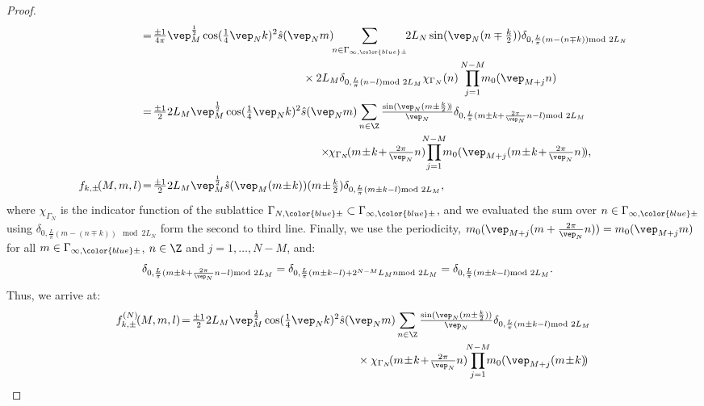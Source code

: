 \documentclass[a4paper, 11pt]{article}
\DeclareMathOperator{\1}{\mathds{1}}
\begin{document}
\begin{proof}
\begin{align*}
&\!=\!\tfrac{\pm1}{4\pi}\vep_{M}^{\frac{1}{2}} \cos(\tfrac{1}{4}\vep_{N}k)^{2}\hat{s}(\vep_{N}m)\!\!\sum_{n\in\Gamma_{\infty,{\color{blue}\pm}}}\!\!2L_{N}\sin(\vep_{N}(n\mp\tfrac{k}{2}))\delta_{0,\frac{L}{\pi}(m-(n\mp k))\!\!\!\!\mod 2L_{N}} \\
& \hspace{5cm} \times 2L_{M}\delta_{0,\frac{L}{\pi}(n-l)\!\!\!\!\mod 2L_{M}}\chi_{\Gamma_{N}}(n)\prod_{j=1}^{N-M}\!\!\!m_{0}(\vep_{M+j}n) \\
&\!=\!\tfrac{\pm1}{2}2L_{M}\vep_{M}^{\frac{1}{2}} \cos(\tfrac{1}{4}\vep_{N}k)^{2}\hat{s}(\vep_{N}m)\sum_{n\in\Z}\tfrac{\sin(\vep_{N}(m\pm\frac{k}{2})\!)}{\vep_{N}} \delta_{0,\frac{L}{\pi}(m\pm k+\frac{2\pi}{\vep_{N}}n-l)\!\!\!\!\mod 2L_{M}}\\
& \hspace{5.5cm} \times\!\!\chi_{\Gamma_{N}}\!(m\!\pm\!k\!+\!\tfrac{2\pi}{\vep_{N}}n)\!\!\!\prod_{j=1}^{N-M}\!\!\!m_{0}(\vep_{M+j}(m\!\pm\!k\!+\!\tfrac{2\pi}{\vep_{N}}n)\!), \\
f_{k,\pm}\!(M,m,l) &\!=\!\tfrac{\pm1}{2}2L_{M}\vep_{M}^{\frac{1}{2}}\hat{s}(\vep_{M}(m\!\pm\!k))(m\!\pm\!\tfrac{k}{2})\delta_{0,\frac{L}{\pi}(m\pm k-l)\!\!\!\!\mod 2L_{M}},
\end{align*}
where $\chi_{\Gamma_{N}}$ is the indicator function of the sublattice $\Gamma_{N,{\color{blue}\pm}}\subset\Gamma_{\infty,{\color{blue}\pm}}$, and we evaluated the sum over $n\in\Gamma_{\infty,{\color{blue}\pm}}$ using $\delta_{0,\frac{L}{\pi}(m-(n\mp k))\!\!\!\!\mod 2L_{N}}$ form the second to third line. Finally, we use the periodicity, $m_{0}(\vep_{M+j}(m+\tfrac{2\pi}{\vep_{N}}n)) = m_{0}(\vep_{M+j}m)$ for all $m\in\Gamma_{\infty,{\color{blue}\pm}}$, $n\in\Z$ and $j=1,\dots,N-M$, and:
\begin{align*}
\delta_{0,\frac{L}{\pi}(m\pm k+\frac{2\pi}{\vep_{N}}n-l)\!\!\!\!\mod 2L_{M}} & = \delta_{0,\frac{L}{\pi}(m\pm k-l)+2^{N-M}L_{M}n\!\!\!\!\mod 2L_{M}} = \delta_{0,\frac{L}{\pi}(m\pm k-l)\!\!\!\!\mod 2L_{M}}.
\end{align*}
Thus, we arrive at:
\begin{align*}
f^{(N)}_{k,\pm}\!(M,m,l) &\!=\!\tfrac{\pm1}{2}2L_{M}\vep_{M}^{\frac{1}{2}} \cos(\tfrac{1}{4}\vep_{N}k)^{2}\hat{s}(\vep_{N}m)\sum_{n\in\Z}\tfrac{\sin(\vep_{N}(m\pm\frac{k}{2}))}{\vep_{N}} \delta_{0,\frac{L}{\pi}(m\pm k-l)\!\!\!\!\mod 2L_{M}}\\
& \hspace{5.5cm} \times \chi_{\Gamma_{N}}\!(m\!\pm\!k\!+\!\tfrac{2\pi}{\vep_{N}}n)\!\!\prod_{j=1}^{N-M}\!\!\!m_{0}(\vep_{M+j}(m\!\pm\!k)\!) \\

\end{align*}
\end{proof}
\end{document}
